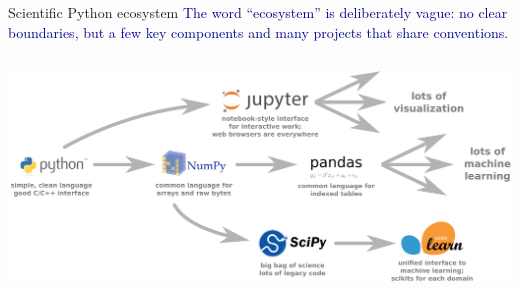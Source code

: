 \documentclass[aspectratio=169]{beamer}
\begin{document}
\begin{frame}{Scientific Python ecosystem}
\vspace{0.35 cm}
\textcolor{darkblue}{The word ``ecosystem'' is deliberately vague: no clear boundaries, but a few key components and many projects that share conventions.}

\begin{columns}
\includegraphics[width=\linewidth]{software-ecosystem.pdf}
\end{columns}
\end{frame}
\end{document}
